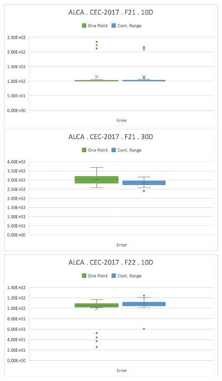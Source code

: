 \documentclass[graybox]{svmult}
\begin{document}
    \begin{figure}[!ht]
        \begin{minipage}[h]{0.49\linewidth}
            \includegraphics[width=1\linewidth]{img/fig_experiment_F21x10D.pdf} 
        \end{minipage}
        \hfill
        \vspace{0.05 cm}
        \begin{minipage}[h]{0.49\linewidth}
            \includegraphics[width=1\linewidth]{img/fig_experiment_F21x30D.pdf} 
        \end{minipage}
        \vfill
        \vspace{0.05 cm}
        \begin{minipage}[h]{0.49\linewidth}
            \includegraphics[width=1\linewidth]{img/fig_experiment_F22x10D.pdf} 

\end{minipage}
\end{figure}
\end{document}
